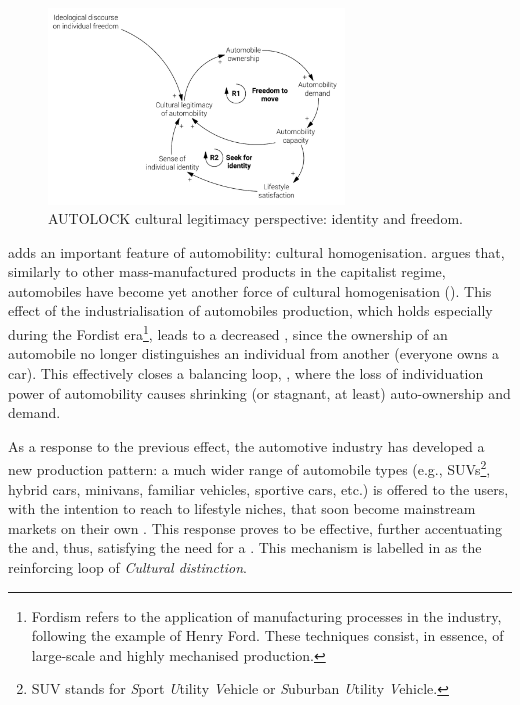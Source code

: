 \begin{figure}[h]
\centering
\includegraphics[width=0.7\textwidth]{figures/model/cropped/cultural_1_core.pdf}
\caption{AUTOLOCK cultural legitimacy perspective: identity and freedom.}
\label{f:results:cld_culture_1}
\end{figure}

 adds an important feature of automobility: cultural homogenisation. \textcite{gartman2004_ThreeAgesAutomobile} argues that, similarly to other mass-manufactured products in the capitalist regime, automobiles have become yet another force of cultural homogenisation (). This effect of the industrialisation of automobiles production, which holds especially during the Fordist era\footnote{Fordism refers to the application of manufacturing processes in the industry, following the example of Henry Ford. These techniques consist, in essence, of large-scale and highly mechanised production.}, leads to a decreased , since the ownership of an automobile no longer distinguishes an individual from another (everyone owns a car). This effectively closes a balancing loop, , where the loss of individuation power of automobility causes shrinking (or stagnant, at least) auto-ownership and demand.

As a response to the previous effect, the automotive industry has developed a new production pattern: a much wider range of automobile types (e.g., SUVs\footnote{SUV stands for \textit{S}port \textit{U}tility \textit{V}ehicle or \textit{S}uburban \textit{U}tility \textit{V}ehicle.}, hybrid cars, minivans, familiar vehicles, sportive cars, etc.) is offered to the users, with the intention to reach to lifestyle niches, that soon become mainstream markets on their own \parencite{gartman2004_ThreeAgesAutomobile}. This response proves to be effective, further accentuating the  and, thus, satisfying the need for a . This mechanism is labelled in  as the  reinforcing loop of \emph{Cultural distinction}.

